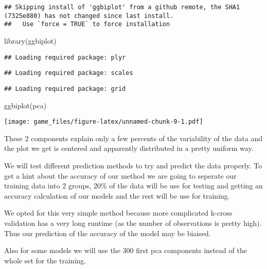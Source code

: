 \documentclass[
]{article}
\newenvironment{Shaded}{\begin{snugshade}}{\end{snugshade}}
\newcommand{\FunctionTok}[1]{\textcolor[rgb]{0.00,0.00,0.00}{#1}}
\newcommand{\NormalTok}[1]{#1}
\begin{document}
\begin{verbatim}
## Skipping install of 'ggbiplot' from a github remote, the SHA1 (7325e880) has not changed since last install.
##   Use `force = TRUE` to force installation
\end{verbatim}

\begin{Shaded}
\begin{Highlighting}[]
\FunctionTok{library}\NormalTok{(ggbiplot)}
\end{Highlighting}
\end{Shaded}

\begin{verbatim}
## Loading required package: plyr
\end{verbatim}

\begin{verbatim}
## Loading required package: scales
\end{verbatim}

\begin{verbatim}
## Loading required package: grid
\end{verbatim}

\begin{Shaded}
\begin{Highlighting}[]
\FunctionTok{ggbiplot}\NormalTok{(pca)}
\end{Highlighting}
\end{Shaded}

\texttt{[image: game\_files/figure-latex/unnamed-chunk-9-1.pdf]}

These 2 components explain only a few percents of the variability of the
data and the plot we get is centered and apparently distributed in a
pretty uniform way.

We will test different prediction methods to try and predict the data
properly. To get a hint about the accuracy of our method we are going to
seperate our training data into 2 groups, 20\% of the data will be use
for testing and getting an accuracy calculation of our models and the
rest will be use for training.

We opted for this very simple method because more complicated k-cross
validation has a very long runtime (as the number of observations is
pretty high). Thus our prediction of the accuracy of the model may be
biaised.

Also for some models we will use the 300 first pca components instead of
the whole set for the training.
\end{document}
